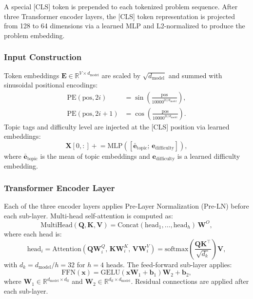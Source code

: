 \documentclass[12pt]{article}
\begin{document}
A special [CLS] token is prepended to each tokenized problem sequence. After three Transformer encoder layers, the [CLS] token representation is projected from 128 to 64 dimensions via a learned MLP and L2-normalized to produce the problem embedding.

\subsubsection{Input Construction}

Token embeddings $\mathbf{E} \in \mathbb{R}^{V \times d_{\text{model}}}$ are scaled by $\sqrt{d_{\text{model}}}$ and summed with sinusoidal positional encodings:
\begin{align}
\text{PE}(\text{pos}, 2i) &= \sin\!\left(\frac{\text{pos}}{10000^{2i/d_{\text{model}}}}\right), \\
\text{PE}(\text{pos}, 2i+1) &= \cos\!\left(\frac{\text{pos}}{10000^{2i/d_{\text{model}}}}\right).
\end{align}
Topic tags and difficulty level are injected at the [CLS] position via learned embeddings:
\begin{equation}
\mathbf{X}[0, :] \mathrel{+}= \text{MLP}\!\left([\bar{\mathbf{e}}_{\text{topic}};\, \mathbf{e}_{\text{difficulty}}]\right),
\end{equation}
where $\bar{\mathbf{e}}_{\text{topic}}$ is the mean of topic embeddings and $\mathbf{e}_{\text{difficulty}}$ is a learned difficulty embedding.

\subsubsection{Transformer Encoder Layer}

Each of the three encoder layers applies Pre-Layer Normalization (Pre-LN) before each sub-layer. Multi-head self-attention is computed as:
\begin{equation}
\text{MultiHead}(\mathbf{Q}, \mathbf{K}, \mathbf{V}) = \text{Concat}(\text{head}_1, \ldots, \text{head}_h)\,\mathbf{W}^O,
\end{equation}
where each head is:
\begin{equation}
\text{head}_i = \text{Attention}(\mathbf{Q}\mathbf{W}_i^Q,\, \mathbf{K}\mathbf{W}_i^K,\, \mathbf{V}\mathbf{W}_i^V) = \text{softmax}\!\left(\frac{\mathbf{Q}\mathbf{K}^\top}{\sqrt{d_k}}\right)\mathbf{V},
\end{equation}
with $d_k = d_{\text{model}} / h = 32$ for $h = 4$ heads. The feed-forward sub-layer applies:
\begin{equation}
\text{FFN}(\mathbf{x}) = \text{GELU}(\mathbf{x}\mathbf{W}_1 + \mathbf{b}_1)\mathbf{W}_2 + \mathbf{b}_2,
\end{equation}
where $\mathbf{W}_1 \in \mathbb{R}^{d_{\text{model}} \times d_{\text{ff}}}$ and $\mathbf{W}_2 \in \mathbb{R}^{d_{\text{ff}} \times d_{\text{model}}}$. Residual connections are applied after each sub-layer.
\end{document}
